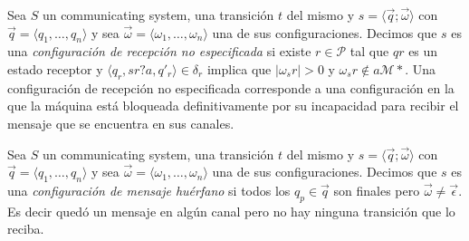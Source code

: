 \begin{definition}Sea $S$ un communicating system, una transición $t$ del mismo y $s= \langle \overrightarrow{q} ; \overrightarrow{\omega} \rangle$ con $\overrightarrow{q}= \langle q_1, \ldots, q_n \rangle$ y sea $\overrightarrow{\omega}= \langle \omega_1, \ldots, \omega_n \rangle$ una de sus configuraciones. Decimos que $s$ es una \textit{configuración de recepción no especificada} si existe $r \in \mathcal{P}$ tal que $qr$ es un estado receptor y $\langle q_r,sr?a,q'_r \rangle \in \delta_r$ implica que $|\omega_sr| > 0$ y $\omega_sr \notin a\mathcal{M}*$. Una configuración de recepción no especificada corresponde a una configuración en la que la máquina está bloqueada definitivamente por su incapacidad para recibir el mensaje que se encuentra en sus canales.
\end{definition}

\begin{definition} Sea $S$ un communicating system, una transición $t$ del mismo y $s= \langle \overrightarrow{q} ; \overrightarrow{\omega} \rangle$ con $\overrightarrow{q}= \langle q_1, \ldots, q_n \rangle$ y sea $\overrightarrow{\omega}= \langle \omega_1, \ldots, \omega_n \rangle$ una de sus configuraciones. Decimos que $s$ es una \textit{configuración de mensaje huérfano} si todos los $q_p \in \overrightarrow{q}$ son finales pero $\overrightarrow{\omega} \neq \overrightarrow{\epsilon}$. Es decir quedó un mensaje en algún canal pero no hay ninguna transición que lo reciba.
\end{definition}

